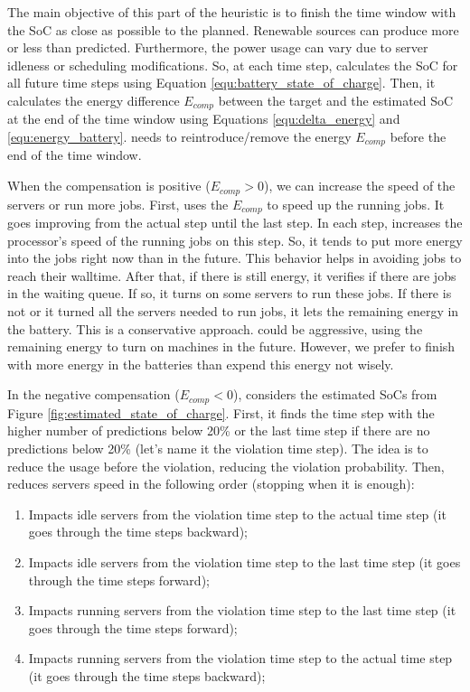 The main objective of this part of the heuristic is to finish the time window with the SoC as close as possible to the planned. Renewable sources can produce more or less than predicted. Furthermore, the power usage can vary due to server idleness or scheduling modifications. So, at each time step, \emph{\systemName} calculates the SoC for all future time steps using Equation \ref{equ:battery_state_of_charge}. Then, it calculates the energy difference $E_{comp}$ between the target and the estimated SoC at the end of the time window using Equations \ref{equ:delta_energy} and \ref{equ:energy_battery}. \emph{\systemName} needs to reintroduce/remove the energy $E_{comp}$ before the end of the time window.

When the compensation is positive ($E_{comp}>0$), we can increase the speed of the servers or run more jobs. First, \emph{\systemName} uses the $E_{comp}$ to speed up the running jobs. It goes improving from the actual step until the last step. In each step, \emph{\systemName} increases the processor's speed of the running jobs on this step. So, it tends to put more energy into the jobs right now than in the future. This behavior helps in avoiding jobs to reach their walltime. After that, if there is still energy, it verifies if there are jobs in the waiting queue. If so, it turns on some servers to run these jobs. If there is not or it turned all the servers needed to run jobs, it lets the remaining energy in the battery. This is a conservative approach. \emph{\systemName} could be aggressive, using the remaining energy to turn on machines in the future. However, we prefer to finish with more energy in the batteries than expend this energy not wisely.

In the negative compensation ($E_{comp}<0$), \emph{\systemName} considers the estimated SoCs from Figure \ref{fig:estimated_state_of_charge}. First, it finds the time step with the higher number of predictions below 20\% or the last time step if there are no predictions below 20\% (let's name it the violation time step). The idea is to reduce the usage before the violation, reducing the violation probability. Then, \emph{\systemName} reduces servers speed in the following order (stopping when it is enough):
\begin{enumerate}
    \item Impacts idle servers from the violation time step to the actual time step (it goes through the time steps backward);
    \item Impacts idle servers from the violation time step to the last time step (it goes through the time steps forward);
    \item Impacts running servers from the violation time step to the last time step (it goes through the time steps forward);
    \item Impacts running servers from the violation time step to the actual time step (it goes through the time steps backward);
\end{enumerate}

